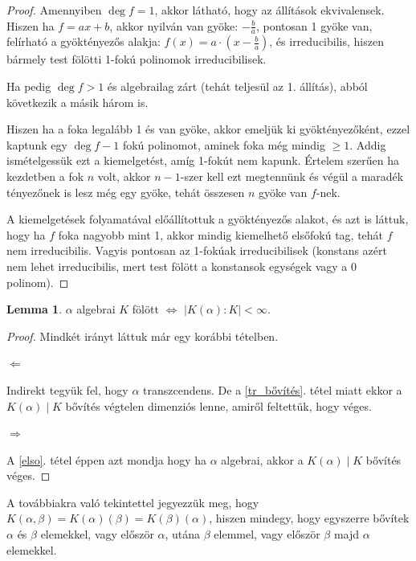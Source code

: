 \documentclass[12pt]{book}
\theoremstyle{plain} %
\theoremstyle{definition} %
\newtheorem{lem/}{Lemma}[section]
\newenvironment{lem}
  {\renewcommand{\qedsymbol}{$\clubsuit$}%
   \pushQED{\qed}\begin{lem/}}
  {\popQED\end{lem/}}
\theoremstyle{remark}
\renewcommand\qedsymbol{$\blacksquare$}
\numberwithin{equation}{section}  %
\begin{document}
	\begin{proof}
		Amennyiben $\deg f = 1$, akkor látható, hogy az állítások ekvivalensek. Hiszen ha $f=ax+b$, akkor nyilván van gyöke: $-\frac{b}{a}$, pontosan 1 gyöke van, felírható a gyöktényezős alakja: $f(x)=a\cdot (x-\frac{b}{a})$, és irreducibilis, hiszen bármely test fölötti 1-fokú polinomok irreducibilisek.
		
		Ha pedig $\deg f > 1$ és algebrailag zárt (tehát teljesül az 1. állítás), abból következik a másik három is.
		
		Hiszen ha a foka legalább 1 és van gyöke, akkor emeljük ki gyöktényezőként, ezzel kaptunk egy $\deg f -1$ fokú polinomot, aminek foka még mindig $\geq 1$. Addig ismételgessük ezt a kiemelgetést, amíg 1-fokút nem kapunk. Értelem szerűen ha kezdetben a fok $n$ volt, akkor $n-1$-szer kell ezt megtennünk és végül a maradék tényezőnek is lesz még egy gyöke, tehát összesen $n$ gyöke van $f$-nek.
		
		A kiemelgetések folyamatával előállítottuk a gyöktényezős alakot, és azt is láttuk, hogy ha $f$ foka nagyobb mint 1, akkor mindig kiemelhető elsőfokú tag, tehát $f$ nem irreducibilis. Vagyis pontosan az 1-fokúak irreducibilisek (konstans azért nem lehet irreducibilis, mert test fölött a konstansok egységek vagy a 0 polinom).
	\end{proof}

	\begin{lem}\label{segedtetel}
		$\alpha$ algebrai $K$ fölött $\Leftrightarrow$ $|K(\alpha):K|<\infty$.
	\end{lem}

	\begin{proof}
		Mindkét irányt láttuk már egy korábbi tételben.
		
		\textit{$\Leftarrow$}
		
		Indirekt tegyük fel, hogy $\alpha$ transzcendens. De a \ref{tr_bővítés}. tétel miatt ekkor a $K(\alpha)\mid K$ bővítés végtelen dimenziós lenne, amiről feltettük, hogy véges.
		
		\textit{$\Rightarrow$}
		
		A \ref{elso}. tétel éppen azt mondja hogy ha $\alpha$ algebrai, akkor a $K(\alpha)\mid K$ bővítés véges.
	\end{proof}

	A továbbiakra való tekintettel jegyezzük meg, hogy $K(\alpha,\beta)=K(\alpha)(\beta)=K(\beta)(\alpha)$, hiszen mindegy, hogy egyszerre bővítek $\alpha$ és $\beta$ elemekkel, vagy először $\alpha$, utána $\beta$ elemmel, vagy először $\beta$ majd $\alpha$ elemekkel.
\end{document}
